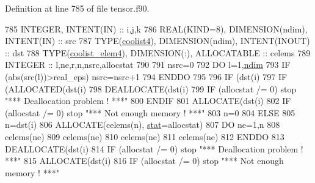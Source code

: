 Definition at line 785 of file tensor.\+f90.


\begin{DoxyCode}
785     \textcolor{keywordtype}{INTEGER}, \textcolor{keywordtype}{INTENT(IN)} :: i,j,k
786     \textcolor{keywordtype}{REAL(KIND=8)}, \textcolor{keywordtype}{DIMENSION(ndim)}, \textcolor{keywordtype}{INTENT(IN)} :: src
787     \textcolor{keywordtype}{TYPE}(\hyperlink{structtensor_1_1coolist4}{coolist4}), \textcolor{keywordtype}{DIMENSION(ndim)}, \textcolor{keywordtype}{INTENT(INOUT)} :: dst
788     \textcolor{keywordtype}{TYPE}(\hyperlink{structtensor_1_1coolist__elem4}{coolist\_elem4}), \textcolor{keywordtype}{DIMENSION(:)}, \textcolor{keywordtype}{ALLOCATABLE} :: celems
789     \textcolor{keywordtype}{INTEGER} :: l,ne,r,n,nsrc,allocstat
790 
791     nsrc=0
792     \textcolor{keywordflow}{DO} l=1,\hyperlink{namespaceparams_a2323fe1773f086e20c14f266351c482b}{ndim}
793        \textcolor{keywordflow}{IF} (abs(src(l))>real\_eps) nsrc=nsrc+1
794 \textcolor{keywordflow}{    ENDDO}
795 
796     \textcolor{keywordflow}{IF} (dst(i)%
797        \textcolor{keywordflow}{IF} (\textcolor{keyword}{ALLOCATED}(dst(i)%
798           \textcolor{keyword}{DEALLOCATE}(dst(i)%
799           \textcolor{keywordflow}{IF} (allocstat /= 0) stop \textcolor{stringliteral}{"*** Deallocation problem ! ***"}
800 \textcolor{keywordflow}{       ENDIF}
801        \textcolor{keyword}{ALLOCATE}(dst(i)%
802        \textcolor{keywordflow}{IF} (allocstat /= 0) stop \textcolor{stringliteral}{"*** Not enough memory ! ***"}
803        n=0
804     \textcolor{keywordflow}{ELSE}
805        n=dst(i)%
806        \textcolor{keyword}{ALLOCATE}(celems(n), \hyperlink{namespacestat}{stat}=allocstat)
807        \textcolor{keywordflow}{DO} ne=1,n
808           celems(ne)%
809           celems(ne)%
810           celems(ne)%
811           celems(ne)%
812 \textcolor{keywordflow}{       ENDDO}
813        \textcolor{keyword}{DEALLOCATE}(dst(i)%
814        \textcolor{keywordflow}{IF} (allocstat /= 0) stop \textcolor{stringliteral}{"*** Deallocation problem ! ***"}
815        \textcolor{keyword}{ALLOCATE}(dst(i)%
816        \textcolor{keywordflow}{IF} (allocstat /= 0) stop \textcolor{stringliteral}{"*** Not enough memory ! ***"}

\end{DoxyCode}
